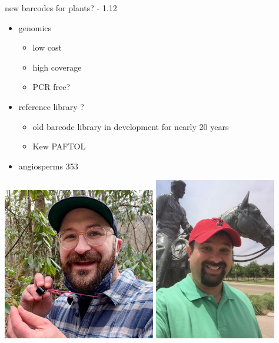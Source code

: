 \documentclass[
  ignorenonframetext,
]{beamer}
\providecommand{\tightlist}{%
  \setlength{\itemsep}{0pt}\setlength{\parskip}{0pt}}
\begin{document}
\begin{frame}{new barcodes for plants? - 1.12}
\protect\hypertarget{new-barcodes-for-plants---1.12}{}
\begin{itemize}
\tightlist
\item
  genomics

  \begin{itemize}
  \tightlist
  \item
    low cost
  \item
    high coverage
  \item
    PCR free?
  \end{itemize}
\item
  reference library ?

  \begin{itemize}
  \tightlist
  \item
    old barcode library in development for nearly 20 years
  \item
    Kew PAFTOL
  \end{itemize}
\item
  angiosperms 353
\end{itemize}

\includegraphics[width=0.5\textwidth,height=\textheight]{../graphics/pictures/norm-wickett.jpg}
\includegraphics[width=0.4\textwidth,height=\textheight]{../graphics/pictures/matt-johnson.jpg}
\end{frame}
\end{document}
